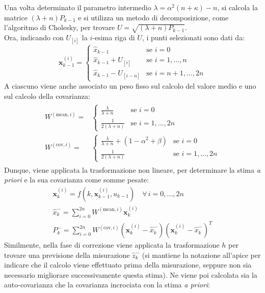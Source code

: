 \documentclass[12pt,a4paper,openright,twoside]{book}
\begin{document}
Una volta determinato il parametro intermedio $\lambda=\alpha^2(n+\kappa)-n$, si calcola la matrice $(\lambda+n)P_{k-1}$ e si utilizza un metodo di decomposizione, come l'algoritmo di Cholesky, per trovare $U=\sqrt{(\lambda+n)P_{k-1}}$. \\
Ora, indicando con $U_{[i]}$ la $i$-esima riga di $U$, i punti selezionati sono dati da:
\begin{equation*}
\mathbf{x}_{k-1}^{(i)}=\begin{cases}
\hat{x}_{k-1} & \text{se }i=0 \\
\hat{x}_{k-1}+U_{[i]} & \text{se }i=1,...,n \\
\hat{x}_{k-1}-U_{[i-n]} & \text{se }i=n+1,...,2n
\end{cases}
\end{equation*}
A ciascuno viene anche associato un peso fisso sul calcolo del valore medio e uno sul calcolo della covarianza:
\begin{gather*}
\begin{aligned}
W^{(\text{mean},i)}=&\begin{cases}
\frac{\lambda}{\lambda+n} & \text{se }i=0 \\
\frac{1}{2(\lambda+n)} & \text{se }i=1,...,2n
\end{cases} \\
W^{(\text{cov},i)}=&\begin{cases}
\frac{\lambda}{\lambda+n}+(1-\alpha^2+\beta) & \text{se }i=0 \\
\frac{1}{2(\lambda+n)} & \text{se }i=1,...,2n
\end{cases}
\end{aligned}
\end{gather*}
Dunque, viene applicata la trasformazione non lineare, per determinare la stima \textit{a priori} e la sua covarianza come somme pesate:
\begin{gather*}
\mathbf{x}_k^{(i)}=f(k,\mathbf{x}_{k-1}^{(i)},u_{k-1})\quad\forall\,i=0,...,2n \\
\hat{x}_k^-=\sum_{i=0}^{2n}W^{(\text{mean},i)}\mathbf{x}_k^{(i)} \\
P_k^-=\sum_{i=0}^{2n}W^{(\text{cov},i)}\left(\mathbf{x}_k^{(i)}-\hat{x}_k^-\right)\left(\mathbf{x}_k^{(i)}-\hat{x}_k^-\right)^T
\end{gather*}
Similmente, nella fase di correzione viene applicata la trasformazione $h$ per trovare una previsione della misurazione $\hat{z}_k^-$ (si mantiene la notazione all'apice per indicare che il calcolo viene effettuato prima della misurazione, seppure non sia necessario migliorare successivamente questa stima). Ne viene poi calcolata sia la auto-covarianza che la covarianza incrociata con la stima \textit{a priori}:
\end{document}
